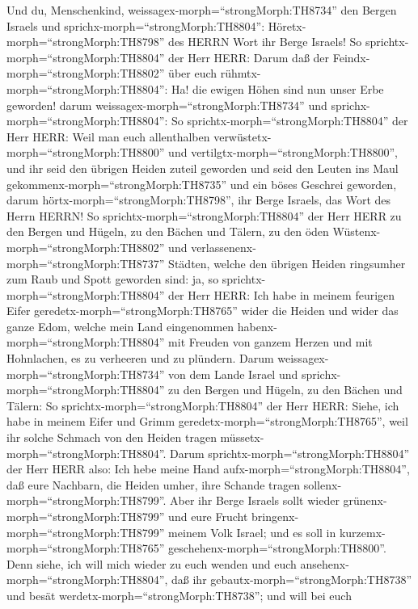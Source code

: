  Und du, Menschenkind,
weissagex-morph=``strongMorph:TH8734'' den Bergen Israels und
sprichx-morph=``strongMorph:TH8804'':
Höretx-morph=``strongMorph:TH8798'' des HERRN Wort ihr Berge Israels!
 So sprichtx-morph=``strongMorph:TH8804'' der Herr HERR:
Darum daß der Feindx-morph=``strongMorph:TH8802'' über euch
rühmtx-morph=``strongMorph:TH8804'': Ha! die ewigen Höhen sind nun unser
Erbe geworden!  darum weissagex-morph=``strongMorph:TH8734''
und sprichx-morph=``strongMorph:TH8804'': So
sprichtx-morph=``strongMorph:TH8804'' der Herr HERR: Weil man euch
allenthalben verwüstetx-morph=``strongMorph:TH8800'' und
vertilgtx-morph=``strongMorph:TH8800'', und ihr seid den übrigen Heiden
zuteil geworden und seid den Leuten ins Maul
gekommenx-morph=``strongMorph:TH8735'' und ein böses Geschrei geworden,
 darum hörtx-morph=``strongMorph:TH8798'', ihr Berge
Israels, das Wort des Herrn HERRN! So
sprichtx-morph=``strongMorph:TH8804'' der Herr HERR zu den Bergen und
Hügeln, zu den Bächen und Tälern, zu den öden
Wüstenx-morph=``strongMorph:TH8802'' und
verlassenenx-morph=``strongMorph:TH8737'' Städten, welche den übrigen
Heiden ringsumher zum Raub und Spott geworden sind:  ja, so
sprichtx-morph=``strongMorph:TH8804'' der Herr HERR: Ich habe in meinem
feurigen Eifer geredetx-morph=``strongMorph:TH8765'' wider die Heiden
und wider das ganze Edom, welche mein Land eingenommen
habenx-morph=``strongMorph:TH8804'' mit Freuden von ganzem Herzen und
mit Hohnlachen, es zu verheeren und zu plündern.  Darum
weissagex-morph=``strongMorph:TH8734'' von dem Lande Israel und
sprichx-morph=``strongMorph:TH8804'' zu den Bergen und Hügeln, zu den
Bächen und Tälern: So sprichtx-morph=``strongMorph:TH8804'' der Herr
HERR: Siehe, ich habe in meinem Eifer und Grimm
geredetx-morph=``strongMorph:TH8765'', weil ihr solche Schmach von den
Heiden tragen müssetx-morph=``strongMorph:TH8804''.  Darum
sprichtx-morph=``strongMorph:TH8804'' der Herr HERR also: Ich hebe meine
Hand aufx-morph=``strongMorph:TH8804'', daß eure Nachbarn, die Heiden
umher, ihre Schande tragen sollenx-morph=``strongMorph:TH8799''.
 Aber ihr Berge Israels sollt wieder
grünenx-morph=``strongMorph:TH8799'' und eure Frucht
bringenx-morph=``strongMorph:TH8799'' meinem Volk Israel; und es soll in
kurzemx-morph=``strongMorph:TH8765''
geschehenx-morph=``strongMorph:TH8800''.  Denn siehe, ich
will mich wieder zu euch wenden und euch
ansehenx-morph=``strongMorph:TH8804'', daß ihr
gebautx-morph=``strongMorph:TH8738'' und besät
werdetx-morph=``strongMorph:TH8738'';  und will bei euch
